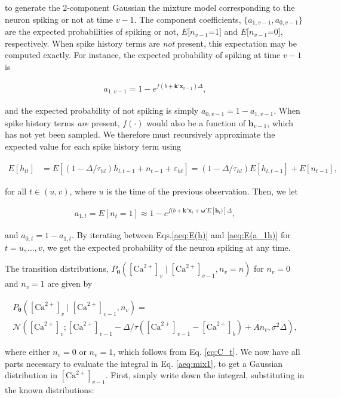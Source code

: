 \documentclass[12pt]{article}
\providecommand{\ve}[1]{\boldsymbol{#1}}
\providecommand{\ve}[1]{\boldsymbol{#1}}
\newcommand{\thetn}{\ve{\theta}}
\newcommand{\p}{P_{\thetn}}
\newcommand{\Ca}{[\text{Ca}^{2+}]}
\begin{document}
\noindent to generate the 2-component Gaussian the mixture model corresponding to the neuron spiking or not at time $v-1$. The component coefficients, $\{a_{1,v-1},a_{0,v-1}\}$ are the expected probabilities of spiking or not, $E[n_{v-1}$=$1]$ and $E[n_{v-1}$=$0]$, respectively. When spike history terms are \emph{not} present, this expectation may be computed exactly.  For instance, the expected probability of spiking at time $v-1$ is

\begin{align} \label{aeq:E(a_1)}
a_{1,v-1} = 1-e^{f(b+\ve{k}'\ve{x}_{v-1})\Delta},
\end{align}

\noindent and the expected probability of not spiking is simply $a_{0,v-1}=1-a_{1,v-1}$.  When spike history terms \emph{are} present, $f(\cdot)$ would also be a function of $\ve{h}_{v-1}$, which has not yet been sampled.  We therefore must recursively approximate the expected value for each spike history term using

\begin{align} \label{aeq:E(h)}
E[h_{lt}] &= E\left[(1-\Delta/\tau_{hl}) h_{l,t-1} + n_{t-1} + \varepsilon_{ht}\right]  = (1-\Delta/\tau_{hl}) E[h_{l,t-1}] + E[n_{t-1}],
\end{align}

\noindent for all $t\in(u,v)$, where $u$ is the time of the previous observation. Then, we let

\begin{align} \label{aeq:E(a_1h)}
a_{1,t} = E[n_{t}=1] \approx 1-e^{f(b+\ve{k}'\ve{x}_t + \ve{\omega}'E[\ve{h}_t)]\Delta},
\end{align}

\noindent and $a_{0,t}=1-a_{1,t}$. By iterating between Eqs.\ref{aeq:E(h)} and \ref{aeq:E(a_1h)} for $t=u,\ldots,v$, we get the expected probability of the neuron spiking at any time.

The transition distributions, $\p(\Ca_v \mid \Ca_{v-1}, n_v=n)$ for $n_v=0$ and $n_v=1$ are given by

\begin{multline}
\p(\Ca_v \mid \Ca_{v-1}, n_v) =\\
\mathcal{N}(\Ca_v; \Ca_{v-1} -\Delta/\tau (\Ca_{v-1} - \Ca_b) + A n_v, \sigma^2 \Delta),
\end{multline}

\noindent where either $n_v=0$ or $n_v=1$, which follows from Eq. \ref{eq:C_t}. We now have all parts necessary to evaluate the integral in Eq. \ref{aeq:mix1}, to get a Gaussian distribution in $\Ca_{v-1}$.  First, simply write down the integral, substituting in the known distributions:
\end{document}
